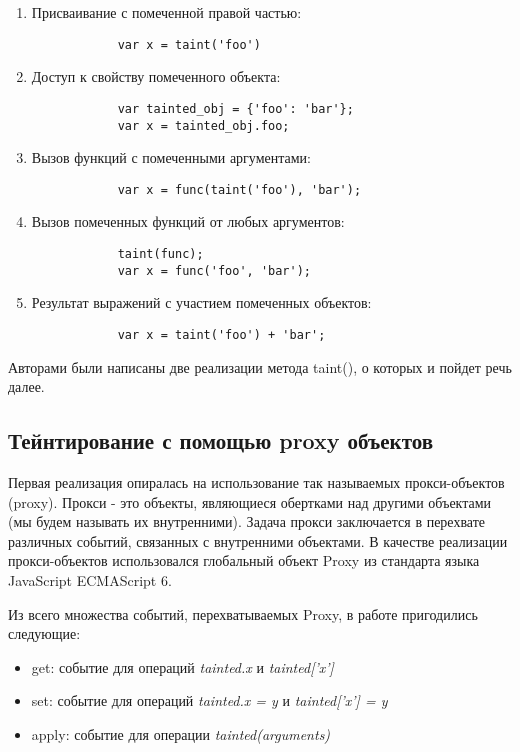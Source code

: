 \begin{enumerate}
	\item Присваивание с помеченной правой частью:
		\begin{lstlisting}
			var x = taint('foo')
		\end{lstlisting}
	\item Доступ к свойству помеченного объекта: 
		\begin{lstlisting}
			var tainted_obj = {'foo': 'bar'}; 
			var x = tainted_obj.foo; 
		\end{lstlisting}
	\item Вызов функций с помеченными аргументами:
		\begin{lstlisting}
			var x = func(taint('foo'), 'bar');
		\end{lstlisting}
	\item Вызов помеченных функций от любых аргументов:
		\begin{lstlisting}
			taint(func);
			var x = func('foo', 'bar');
		\end{lstlisting}
	\item Результат выражений с участием помеченных объектов:
		\begin{lstlisting}
			var x = taint('foo') + 'bar';
		\end{lstlisting}
\end{enumerate}


Авторами были написаны две реализации метода taint(), о которых и пойдет речь далее.

\subsection{Тейнтирование с помощью proxy объектов}
	Первая реализация опиралась на использование так называемых прокси-объектов (proxy). Прокси - это объекты, являющиеся обертками над другими объектами (мы будем называть их внутренними). Задача прокси заключается в перехвате различных событий, связанных с внутренними объектами. В качестве реализации прокси-объектов использовался глобальный объект Proxy \cite{proxy} из стандарта языка JavaScript ECMAScript 6.

	
	Из всего множества событий, перехватываемых Proxy, в работе пригодились следующие:
	

	\begin{itemize}
		\item get: событие для операций \textit{tainted.x} и \textit{tainted['x']}
		\item set: событие для операций \textit{tainted.x = y} и \textit{tainted['x'] = y}
		\item apply: событие для операции \textit{tainted(arguments)}
	\end{itemize}


